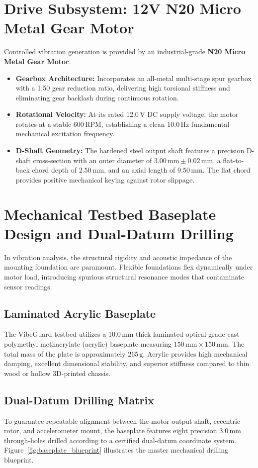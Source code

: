\section{Drive Subsystem: 12V N20 Micro Metal Gear Motor}
Controlled vibration generation is provided by an industrial-grade \textbf{N20 Micro Metal Gear Motor}.
\begin{itemize}
    \item \textbf{Gearbox Architecture:} Incorporates an all-metal multi-stage spur gearbox with a 1:50 gear reduction ratio, delivering high torsional stiffness and eliminating gear backlash during continuous rotation.
    \item \textbf{Rotational Velocity:} At its rated 12.0\,V DC supply voltage, the motor rotates at a stable 600\,RPM, establishing a clean $10.0$\,Hz fundamental mechanical excitation frequency.
    \item \textbf{D-Shaft Geometry:} The hardened steel output shaft features a precision D-shaft cross-section with an outer diameter of $3.00\,\text{mm} \pm 0.02\,\text{mm}$, a flat-to-back chord depth of $2.50\,\text{mm}$, and an axial length of $9.50\,\text{mm}$. The flat chord provides positive mechanical keying against rotor slippage.
\end{itemize}

\section{Mechanical Testbed Baseplate Design and Dual-Datum Drilling}
In vibration analysis, the structural rigidity and acoustic impedance of the mounting foundation are paramount. Flexible foundations flex dynamically under motor load, introducing spurious structural resonance modes that contaminate sensor readings.

\subsection{Laminated Acrylic Baseplate}
The VibeGuard testbed utilizes a 10.0\,mm thick laminated optical-grade cast polymethyl methacrylate (acrylic) baseplate measuring $150\,\text{mm} \times 150\,\text{mm}$. The total mass of the plate is approximately $265\,\text{g}$. Acrylic provides high mechanical damping, excellent dimensional stability, and superior stiffness compared to thin wood or hollow 3D-printed chassis.

\subsection{Dual-Datum Drilling Matrix}
To guarantee repeatable alignment between the motor output shaft, eccentric rotor, and accelerometer mount, the baseplate features eight precision 3.0\,mm through-holes drilled according to a certified dual-datum coordinate system. Figure~\ref{fig:baseplate_blueprint} illustrates the master mechanical drilling blueprint.

